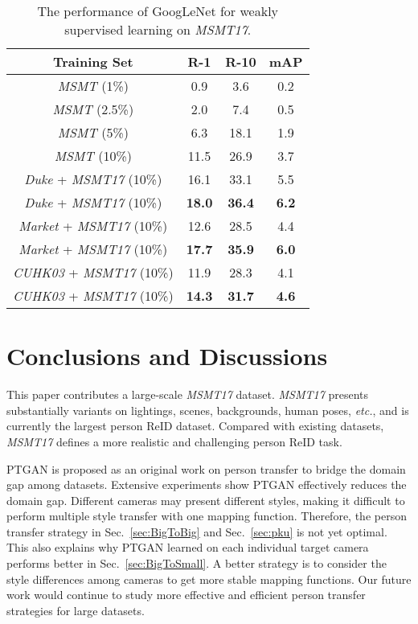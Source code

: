 \documentclass[10pt,twocolumn,letterpaper]{article}
\begin{document}
\begin{table}
\footnotesize
\begin{center}
\caption{The performance of GoogLeNet for weakly supervised learning on \emph{MSMT17}.}\label{tab:tab6}
\begin{tabular}{c|c|c|c}
\hline
{Training Set}       &R-1&R-10  &mAP\\
\hline
\hline
\emph{MSMT} (1\%) &0.9&3.6 &0.2\\
\emph{MSMT} (2.5\%) &2.0&7.4 &0.5\\
\emph{MSMT} (5\%) &6.3&18.1 &1.9\\
\emph{MSMT} (10\%) &11.5&26.9 &3.7\\
\hline
\emph{Duke} + \emph{MSMT17} (10\%)     &16.1&33.1 &5.5 \\
\emph{Duke} + \emph{MSMT17} (10\%)       &\textbf{18.0}&\textbf{36.4} &\textbf{6.2} \\
\hline
\emph{Market} + \emph{MSMT17} (10\%)     &12.6&28.5 &4.4 \\
\emph{Market} + \emph{MSMT17} (10\%)       &\textbf{17.7}&\textbf{35.9} &\textbf{6.0} \\
\hline

\emph{CUHK03} + \emph{MSMT17} (10\%)     &11.9&28.3 &4.1 \\
\emph{CUHK03} + \emph{MSMT17} (10\%)       &\textbf{14.3}&\textbf{31.7} &\textbf{4.6} \\
\hline
\end{tabular}
\end{center}
\vspace{-3mm}
\end{table}



\section{Conclusions and Discussions}\label{sec:discussion}
This paper contributes a large-scale \emph{MSMT17} dataset. \emph{MSMT17} presents substantially variants on lightings, scenes, backgrounds, human poses, \emph{etc.}, and is currently the largest person ReID dataset. Compared with existing datasets, \emph{MSMT17} defines a more realistic and challenging person ReID task.

PTGAN is proposed as an original work on person transfer to bridge the domain gap among datasets. Extensive experiments show PTGAN effectively reduces the domain gap. Different cameras may present different styles, making it difficult to perform multiple style transfer with one mapping function. Therefore, the person transfer strategy in Sec.~\ref{sec:BigToBig} and Sec.~\ref{sec:pku} is not yet optimal. This also explains why PTGAN learned on each individual target camera performs better in Sec.~\ref{sec:BigToSmall}. A better strategy is to consider the style differences among cameras to get more stable mapping functions. Our future work would continue to study more effective and efficient person transfer strategies for large datasets.


{\small


}
\end{document}
